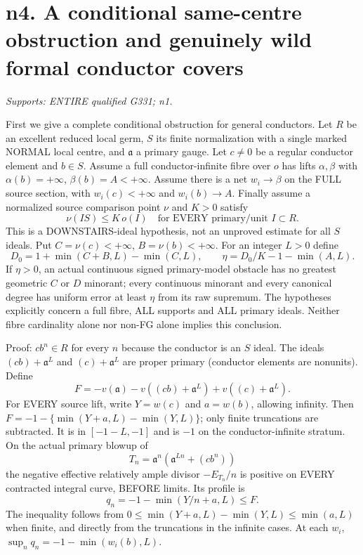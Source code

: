 \section{n4. A conditional same-centre obstruction and genuinely wild formal conductor covers}
\textit{Supports: ENTIRE qualified G331; n1.}

First we give a complete conditional obstruction for general conductors.
Let $R$ be an excellent reduced local germ, $S$ its finite normalization
with a single marked NORMAL local centre, and $\mathfrak a$ a primary
gauge. Let $c\ne0$ be a regular conductor element and $b\in S$.
Assume a full conductor-infinite fibre over $o$ has lifts $\alpha,\beta$
with $\alpha(b)=+\infty$, $\beta(b)=A<+\infty$. Assume there is a net
$w_i\to\beta$ on the FULL source section, with $w_i(c)<+\infty$ and
$w_i(b)\to A$. Finally assume a normalized source comparison point $\nu$
and $K>0$ satisfy
\[
 \nu(IS)\le K\,o(I)\quad\text{for EVERY primary/unit }I\subset R.
\]
This is a DOWNSTAIRS-ideal hypothesis, not an unproved estimate for all
$S$ ideals. Put $C=\nu(c)<+\infty$, $B=\nu(b)<+\infty$. For an integer
$L>0$ define
\[
 D_0=1+\min(C+B,L)-\min(C,L),\qquad
 \eta=D_0/K-1-\min(A,L).
\]
If $\eta>0$, an actual continuous signed primary-model obstacle has no
greatest geometric $C$ or $D$ minorant; every continuous minorant and every
canonical degree has uniform error at least $\eta$ from its raw supremum.
The hypotheses explicitly concern a full fibre, ALL supports and ALL
primary ideals. Neither fibre cardinality alone nor non-FG alone implies
this conclusion.

Proof: $cb^n\in R$ for every $n$ because the conductor is an $S$ ideal.
The ideals $(cb)+\mathfrak a^L$ and $(c)+\mathfrak a^L$ are proper
primary (conductor elements are nonunits). Define
\[
 F=-v(\mathfrak a)-v((cb)+\mathfrak a^L)+v((c)+\mathfrak a^L).
\]
For EVERY source lift, write $Y=w(c)$ and $a=w(b)$, allowing infinity.
Then $F=-1-\{\min(Y+a,L)-\min(Y,L)\}$; only finite truncations are
subtracted. It is in $[-1-L,-1]$ and is $-1$ on the conductor-infinite
stratum. On the actual primary blowup of
\[
 T_n=\mathfrak a^n(\mathfrak a^{Ln}+(cb^n))
\]
the negative effective relatively ample divisor $-E_{T_n}/n$ is positive
on EVERY contracted integral curve, BEFORE limits. Its profile is
\[
 q_n=-1-\min(Y/n+a,L)\le F.
\]
The inequality follows from
$0\le\min(Y+a,L)-\min(Y,L)\le\min(a,L)$ when finite, and directly
from the truncations in the infinite cases. At each $w_i$,
$\sup_n q_n=-1-\min(w_i(b),L)$.

